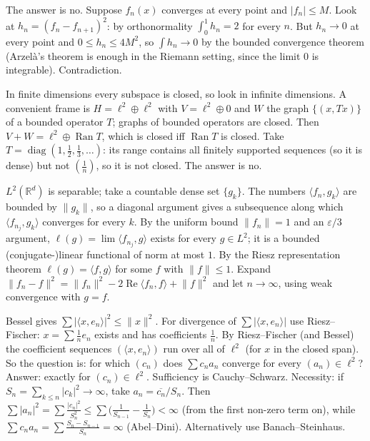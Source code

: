\documentclass[11pt,a4paper]{article}
\begin{document}

The answer is no. Suppose \(f_n(x)\) converges at every point and \(\lvert f_n\rvert\le M\). Look at \(h_n=(f_n-f_{n+1})^2\): by orthonormality \(\int_0^1h_n=2\) for every \(n\).
But \(h_n\to0\) at every point and \(0\le h_n\le4M^2\), so \(\int h_n\to0\) by the bounded convergence theorem (Arzelà's theorem is enough in the Riemann setting, since the limit \(0\) is integrable). Contradiction.

In finite dimensions every subspace is closed, so look in infinite dimensions. A convenient frame is \(H=\ell^2\oplus\ell^2\) with \(V=\ell^2\oplus0\) and \(W\) the graph \(\{(x,Tx)\}\) of a bounded operator \(T\); graphs of bounded operators are closed.
Then \(V+W=\ell^2\oplus\operatorname{Ran}T\), which is closed iff \(\operatorname{Ran}T\) is closed. Take \(T=\operatorname{diag}(1,\frac12,\frac13,\dots)\): its range contains all finitely supported sequences (so it is dense) but not \((\frac1n)\), so it is not closed. The answer is no.

\(L^2(\mathbb R^d)\) is separable; take a countable dense set \(\{g_k\}\). The numbers \(\langle f_n,g_k\rangle\) are bounded by \(\lVert g_k\rVert\), so a diagonal argument gives a subsequence along which \(\langle f_{n_j},g_k\rangle\) converges for every \(k\).
By the uniform bound \(\lVert f_n\rVert=1\) and an \(\varepsilon/3\) argument, \(\ell(g)=\lim\langle f_{n_j},g\rangle\) exists for every \(g\in L^2\); it is a bounded (conjugate-)linear functional of norm at most \(1\). By the Riesz representation theorem \(\ell(g)=\langle f,g\rangle\) for some \(f\) with \(\lVert f\rVert\le1\).
Expand \(\lVert f_n-f\rVert^2=\lVert f_n\rVert^2-2\operatorname{Re}\langle f_n,f\rangle+\lVert f\rVert^2\) and let \(n\to\infty\), using weak convergence with \(g=f\).

Bessel gives \(\sum\lvert\langle x,e_n\rangle\rvert^2\le\lVert x\rVert^2\). For divergence of \(\sum\lvert\langle x,e_n\rangle\rvert\) use Riesz--Fischer: \(x=\sum\frac1ne_n\) exists and has coefficients \(\frac1n\).
By Riesz--Fischer (and Bessel) the coefficient sequences \((\langle x,e_n\rangle)\) run over all of \(\ell^2\) (for \(x\) in the closed span). So the question is: for which \((c_n)\) does \(\sum c_na_n\) converge for every \((a_n)\in\ell^2\)? Answer: exactly for \((c_n)\in\ell^2\). Sufficiency is Cauchy--Schwarz.
Necessity: if \(S_n=\sum_{k\le n}\lvert c_k\rvert^2\to\infty\), take \(a_n=\overline{c_n}/S_n\). Then \(\sum\lvert a_n\rvert^2=\sum\frac{\lvert c_n\rvert^2}{S_n^2}\le\sum\bigl(\frac1{S_{n-1}}-\frac1{S_n}\bigr)\lt\infty\) (from the first non-zero term on), while \(\sum c_na_n=\sum\frac{S_n-S_{n-1}}{S_n}=\infty\) (Abel--Dini). Alternatively use Banach--Steinhaus.
\end{document}
